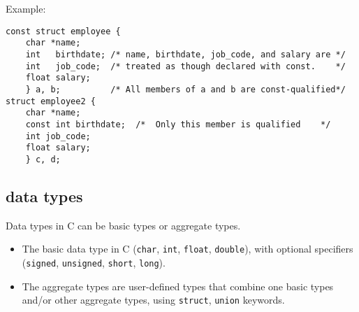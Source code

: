 Example:
\begin{verbatim}
const struct employee {
    char *name;
    int   birthdate; /* name, birthdate, job_code, and salary are */
    int   job_code;  /* treated as though declared with const.    */
    float salary;
    } a, b;          /* All members of a and b are const-qualified*/
struct employee2 {
    char *name;
    const int birthdate;  /*  Only this member is qualified    */
    int job_code;
    float salary;
    } c, d;
\end{verbatim}

\subsection{data types}
\label{sec:C89_datatypes}

Data types in C can be basic types or aggregate types.
\begin{itemize}
  \item  The basic data type in C (\verb!char!, \verb!int!, \verb!float!, \verb!double!),
with optional specifiers (\verb!signed!, \verb!unsigned!, \verb!short!,
\verb!long!).

  \item The aggregate types are user-defined types that combine one basic types
  and/or other aggregate types, using \verb!struct!, \verb!union! keywords.

\end{itemize}

